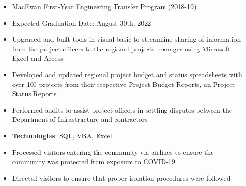 \documentclass[10pt, letterpaper, ragged2e, withhyper]{altacv}
\begin{document}
\tagline{}

\makecvheader


\begin{paracol}{2}
        \begin{itemize}
            \item MacEwan First-Year Engineering Transfer Program (2018-19)
            \item Expected Graduation Date: August 30th, 2022
        \end{itemize}

            \begin{itemize}
                \item Upgraded and built tools in visual basic to streamline sharing of information from the project officers to the regional 
                projects manager using Microsoft Excel and Access 
                \item Developed and updated regional project budget and status spreadsheets with over 100 projects from their respective Project 
                Budget Reports, an Project Status Reports
                \item Performed audits to assist project officers in settling disputes between the Department of Infrastructure and contractors 
                \item \textbf{Technologies}: SQL, VBA, Excel 
            \end{itemize}

            \begin{itemize}
                \item Processed visitors entering the community via airlines to ensure the community was protected from exposure to COVID-19
                \item Directed visitors to ensure that proper isolation procedures were followed
            \end{itemize}


\end{paracol}
\end{document}
